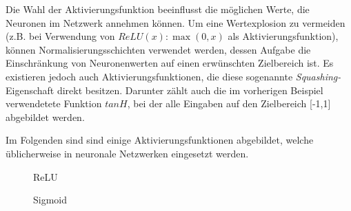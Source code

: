 Die Wahl der Aktivierungsfunktion beeinflusst die möglichen
Werte, die Neuronen im Netzwerk annehmen können. Um eine
Wertexplosion zu vermeiden (z.B. bei Verwendung von $ReLU(x): \max(0,x)$ als
Aktivierungsfunktion), können Normalisierungsschichten verwendet
werden, dessen Aufgabe die Einschränkung von Neuronenwerten auf einen
erwünschten Zielbereich ist. Es existieren jedoch auch Aktivierungsfunktionen,
die diese sogenannte \emph{Squashing-}Eigenschaft direkt besitzen. Darunter
zählt auch die im vorherigen Beispiel verwendetete Funktion $tanH$, bei der
alle Eingaben auf den Zielbereich [-1,1] abgebildet werden.

Im Folgenden sind sind einige Aktivierungsfunktionen abgebildet, welche
üblicherweise in neuronale Netzwerken eingesetzt werden.\bigskip

\begin{figure}[H]
    \begin{minipage}{0.45\textwidth}
        \begin{center}
        \end{center}
        \caption{ReLU}
    \end{minipage}\hfill
    \begin{minipage}{0.45\textwidth}
        \begin{center}
        \end{center}
        \caption{Sigmoid}
    \end{minipage}
\end{figure}
%
